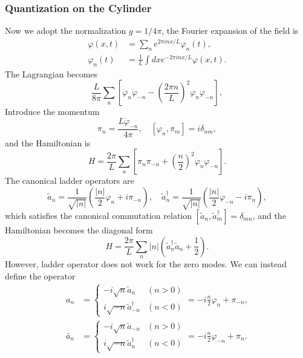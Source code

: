 \documentclass[aps,prb,superscriptaddress,nofootinbib]{revtex4}
\begin{document}
\subsubsection{Quantization on the Cylinder}
Now we adopt the normalization $g = 1/4\pi$, the Fourier expansion of the field is
\begin{equation}
\begin{aligned}
	\varphi(x, t) &=\sum_{n} e^{2 \pi i n x / L} \varphi_{n}(t), \\
	\varphi_{n}(t) &=\frac{1}{L} \int d x e^{-2 \pi i n x / L} \varphi(x, t).
\end{aligned}
\end{equation}
The Lagrangian becomes
\begin{equation}
	\frac{L}{8\pi} \sum_{n}\left[\dot{\varphi}_{n} \dot{\varphi}_{-n}-\left(\frac{2 \pi n}{L}\right)^{2} \varphi_{n} \varphi_{-n}\right],
\end{equation}
Introduce the momentum
\begin{equation}
	\pi_{n}= \frac{L \dot{\varphi}_{-n}}{4\pi}, \quad
	\left[\varphi_{n}, \pi_{m}\right]=i \delta_{n m},
\end{equation}
and the Hamiltonian is
\begin{equation}
	H=\frac{2\pi}{L} \sum_{n}\left[\pi_{n} \pi_{-n}+ \left(\frac{n}{2}\right)^2 \varphi_{n} \varphi_{-n}\right].
\end{equation}
The canonical ladder operators are
\begin{equation}
	\tilde a_n = \frac{1}{\sqrt{|n|}}\left(\frac{|n|}{2}\varphi_n + i\pi_{-n}\right), \quad
	\tilde a_n^\dagger = \frac{1}{\sqrt{|n|}}\left(\frac{|n|}{2}\varphi_{-n} - i\pi_{n}\right),
\end{equation}
which satisfies the canonical commutation relation $[\tilde a_n, \tilde a_m^\dagger] = \delta_{mn}$, and the Hamiltonian becomes the diagonal form
\begin{equation}
	H = \frac{2\pi}{L} \sum_n |n| \left(\tilde a_n^\dagger \tilde a_n + \frac{1}{2} \right).
\end{equation}
However, ladder operator does not work for the zero modes.
We can instead define the operator
\begin{equation}
\begin{aligned}
	a_{n} &= \begin{cases}
		-i \sqrt{n} \tilde{a}_{n} & (n>0) \\
		i \sqrt{-n} \tilde{a}_{-n}^{\dagger} & (n<0)
	\end{cases}
	= -i\frac{n}{2} \varphi_n + \pi_{-n}, \\
	\bar a_{n} &= \begin{cases}
		-i \sqrt{n} \tilde{a}_{-n} & (n>0) \\
		i \sqrt{-n} \tilde{a}_{n}^{\dagger} & (n<0)
	\end{cases}
	= -i\frac{n}{2} \varphi_{-n} + \pi_{n}.
\end{aligned}
\end{equation}
\end{document}
